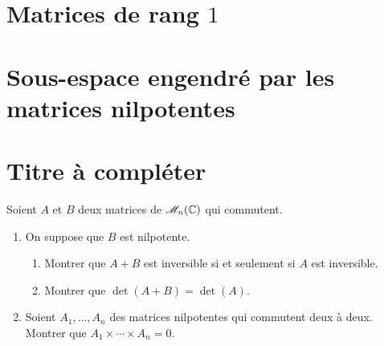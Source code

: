\section{Matrices de rang $1$}


\section{Sous-espace engendré par les matrices nilpotentes}


\section{Titre à compléter}
\begin{exercice}
    \cite{acamanes} 
    Soient $A$ et $B$ deux matrices de $\mathscr{M}_n(\mathbb{C})$ qui commutent. 
    \begin{enumerate}
        \item On suppose que $B$ est nilpotente. 
        \begin{enumerate}
            \item Montrer que $A + B$ est inversible si et seulement si $A$ est inversible.
            \item Montrer que $\det(A+B) = \det(A)$.
        \end{enumerate}
        \item Soient $A_1, \dots, A_n$ des matrices nilpotentes qui commutent deux à deux. Montrer que $A_1 \times \cdots \times A_n = 0$.
    \end{enumerate}
\end{exercice}

